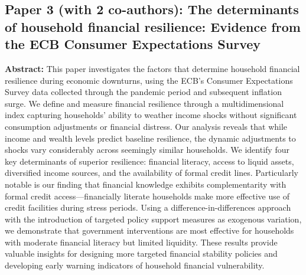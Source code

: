 \documentclass[11pt,a4paper]{article}
\begin{document}
\subsection*{Paper 3 (with 2 co-authors): The determinants of household financial resilience: Evidence from the ECB Consumer Expectations Survey}
\textbf{Abstract:} This paper investigates the factors that determine household financial resilience during economic downturns, using the ECB's Consumer Expectations Survey data collected through the pandemic period and subsequent inflation surge. We define and measure financial resilience through a multidimensional index capturing households' ability to weather income shocks without significant consumption adjustments or financial distress. Our analysis reveals that while income and wealth levels predict baseline resilience, the dynamic adjustments to shocks vary considerably across seemingly similar households. We identify four key determinants of superior resilience: financial literacy, access to liquid assets, diversified income sources, and the availability of formal credit lines. Particularly notable is our finding that financial knowledge exhibits complementarity with formal credit access—financially literate households make more effective use of credit facilities during stress periods. Using a difference-in-differences approach with the introduction of targeted policy support measures as exogenous variation, we demonstrate that government interventions are most effective for households with moderate financial literacy but limited liquidity. These results provide valuable insights for designing more targeted financial stability policies and developing early warning indicators of household financial vulnerability.
\end{document}
